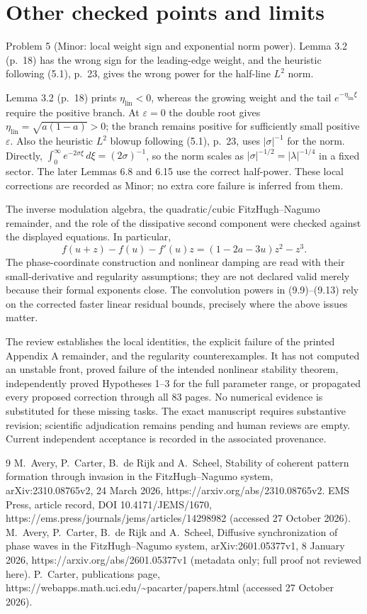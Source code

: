 \documentclass[10pt]{article}
\begin{document}
\section*{Other checked points and limits}
Problem 5 (Minor: local weight sign and exponential norm power).  Lemma 3.2 (p. 18) has the wrong sign for the leading-edge weight, and the heuristic following (5.1), p. 23, gives the wrong power for the half-line \(L^2\) norm.\par
Lemma 3.2 (p. 18) prints \(\eta_\mathrm{lin}<0\), whereas the growing weight and the tail \(e^{-\eta_\mathrm{lin}\xi}\) require the positive branch. At \(\varepsilon=0\) the double root gives \(\eta_\mathrm{lin}=\sqrt{a(1-a)}>0\); the branch remains positive for sufficiently small positive \(\varepsilon\). Also the heuristic \(L^2\) blowup following (5.1), p. 23, uses \(|\sigma|^{-1}\) for the norm. Directly, \(\int_0^\infty e^{-2\sigma\xi}\,d\xi=(2\sigma)^{-1}\), so the norm scales as \(|\sigma|^{-1/2}=|\lambda|^{-1/4}\) in a fixed sector. The later Lemmas 6.8 and 6.15 use the correct half-power. These local corrections are recorded as Minor; no extra core failure is inferred from them.\par
The inverse modulation algebra, the quadratic/cubic FitzHugh–Nagumo remainder, and the role of the dissipative second component were checked against the displayed equations. In particular, \[f(u+z)-f(u)-f'(u)z=(1-2a-3u)z^2-z^3.\] The phase-coordinate construction and nonlinear damping are read with their small-derivative and regularity assumptions; they are not declared valid merely because their formal exponents close. The convolution powers in (9.9)–(9.13) rely on the corrected faster linear residual bounds, precisely where the above issues matter.\par
The review establishes the local identities, the explicit failure of the printed Appendix A remainder, and the regularity counterexamples. It has not computed an unstable front, proved failure of the intended nonlinear stability theorem, independently proved Hypotheses 1–3 for the full parameter range, or propagated every proposed correction through all 83 pages. No numerical evidence is substituted for these missing tasks. The exact manuscript requires substantive revision; scientific adjudication remains pending and human reviews are empty. Current independent acceptance is recorded in the associated provenance.\par
9 M. Avery, P. Carter, B. de Rijk and A. Scheel, Stability of coherent pattern formation through invasion in the FitzHugh–Nagumo system, arXiv:2310.08765v2, 24 March 2026, https://arxiv.org/abs/2310.08765v2. EMS Press, article record, DOI 10.4171/JEMS/1670, https://ems.press/journals/jems/articles/14298982 (accessed 27 October 2026). M. Avery, P. Carter, B. de Rijk and A. Scheel, Diffusive synchronization of phase waves in the FitzHugh–Nagumo system, arXiv:2601.05377v1, 8 January 2026, https://arxiv.org/abs/2601.05377v1 (metadata only; full proof not reviewed here). P. Carter, publications page, https://webapps.math.uci.edu/\textasciitilde{}pacarter/papers.html (accessed 27 October 2026).\par
\end{document}
